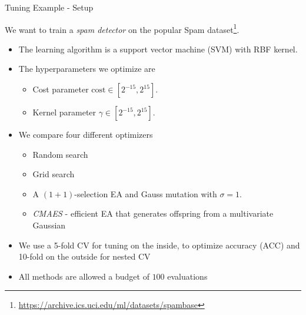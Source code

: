 \documentclass[11pt,compress,t,notes=noshow, xcolor=table]{beamer}
\begin{document}
\begin{frame}{Tuning Example - Setup}

    We want to train a \textit{spam detector} on the popular Spam dataset\footnote{\url{https://archive.ics.uci.edu/ml/datasets/spambase}}.

    \begin{itemize}
        \item The learning algorithm is a support vector machine (SVM) with RBF kernel.
        \item The hyperparameters we optimize are
            \begin{itemize}
                \item Cost parameter $\text{cost} \in [2^{-15}, 2^{15}]$.
                \item Kernel parameter $\gamma \in [2^{-15}, 2^{15}]$.
            \end{itemize}
        \item We compare four different optimizers
            \begin{itemize}
                \item Random search
                \item Grid search
                \item A $(1+1)$-selection EA and Gauss mutation with $\sigma = 1$.
                \item \textit{CMAES} - efficient EA that generates offspring from a multivariate Gaussian
            \end{itemize}
        \item We use a 5-fold CV for tuning on the inside, to optimize accuracy (ACC) and 10-fold on the outside for nested CV
        \item All methods are allowed a budget of $100$ evaluations
    \end{itemize}

\end{frame}
\end{document}
